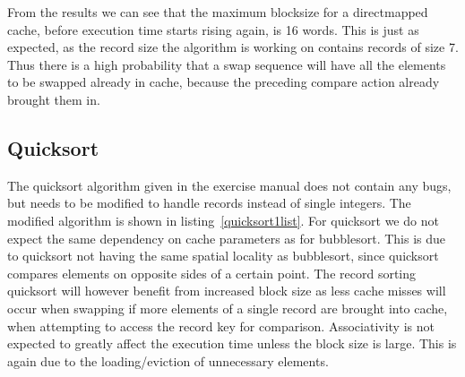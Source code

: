 From the results we can see that the maximum blocksize for a directmapped cache, before execution time starts rising again, is 
16 words. This is just as expected, as the record size the algorithm is working on contains records of size 7.
Thus there is a high probability that a swap sequence will have all the elements to be swapped already in cache,
because the preceding compare action already brought them in.

\subsection{Quicksort}
The quicksort algorithm given in the exercise manual does not contain any bugs, but needs to be modified to handle records instead
of single integers. The modified algorithm is shown in listing~\ref{quicksort1list}.
For quicksort we do not expect the same dependency on cache parameters as for bubblesort. This is due to quicksort not 
having the same spatial locality as bubblesort, since quicksort compares elements on opposite sides of a certain point. 
The record sorting quicksort will however benefit from increased block size as less cache misses will occur when swapping if
more elements of a single record are brought into cache, when attempting to access the record key for comparison. Associativity is
not expected to greatly affect the execution time unless the block size is large. This is again due to the loading/eviction of 
unnecessary elements.

